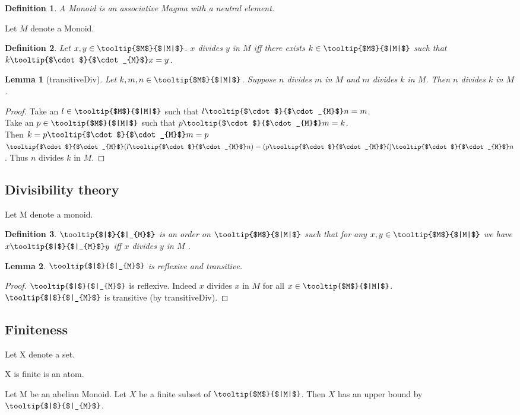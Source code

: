 \documentclass{article}
\newcommand{\gdot}[1]{\mbox{\tooltip{$\cdot$}{$\cdot_{#1}$}}}
\newcommand{\sG}[1]{\mbox{\tooltip{$#1$}{$|#1|$}}}
\newcommand{\oC}[1]{#1}
\newcommand{\DIVI}[1]{\mbox{\tooltip{$|$}{$|_{#1}$}}}
\newtheorem*{definition}{Definition}
\newtheorem{lemma}{Lemma}
\begin{document}
\begin{forthel}
	
	\begin{definition}
		A Monoid is an associative Magma with a neutral element. %
	\end{definition}
	Let $M$ denote a Monoid.
	
	\begin{definition}
		Let $x,y \in \sG{M}$. $x$ divides $y$ in $M$ iff there exists $k \in \sG{M}$ such that $k \gdot{M} x = y$.
	\end{definition}
	\begin{lemma}[transitiveDiv]
		Let $k,m,n \in \sG{M}$. Suppose $n$ divides $m$ in $M$ and 
		$m$ divides $k$ in $M$. Then  $n$ divides $k$ in $M$.
	\end{lemma}
	\begin{proof}
		Take an $l \in \sG{M}$ such that $ l \gdot{M} n = m$. \\
		Take an $p \in \sG{M}$ such that $p \gdot{M} m = k$.  \\
		Then $k = p \gdot{M} m = p$ $\gdot{M} (l \gdot{M} n) = (p \gdot{M} l) \gdot{M} n $.
		Thus $n$ divides $k$ in $M$.
	\end{proof}
\end{forthel}


\subsection{Divisibility theory}
\begin{forthel}
	Let M denote a monoid.
	\begin{definition}
		$\DIVI{M}$ is an order on $\sG{M}$ such that for any $x,y \in \sG{M}$ we have
		$x \oC{\DIVI{M}} y$ iff $x$ divides $y$ in $M$ .
	\end{definition}
	\begin{lemma}
		$\DIVI{M}$ is reflexive and transitive.
	\end{lemma}
	\begin{proof}
		$\DIVI{M}$ is reflexive. Indeed $x$ divides $x$ in $M$ for all $x \in \sG{M}$. \\
		$\DIVI{M}$ is transitive (by transitiveDiv).
	\end{proof}
\end{forthel}
\subsection{Finiteness}
\begin{forthel}
	Let X denote a set. 
	
	\begin{signature}
		X is finite is an atom.
	\end{signature}
	\begin{axiom}[FiniteMultiplication]
		Let M be an abelian Monoid. Let $X$ be a finite subset of $\sG{M}$. Then $X$ has an upper bound by $\DIVI{M}$.
	\end{axiom}
	
\end{forthel}
\end{document}
